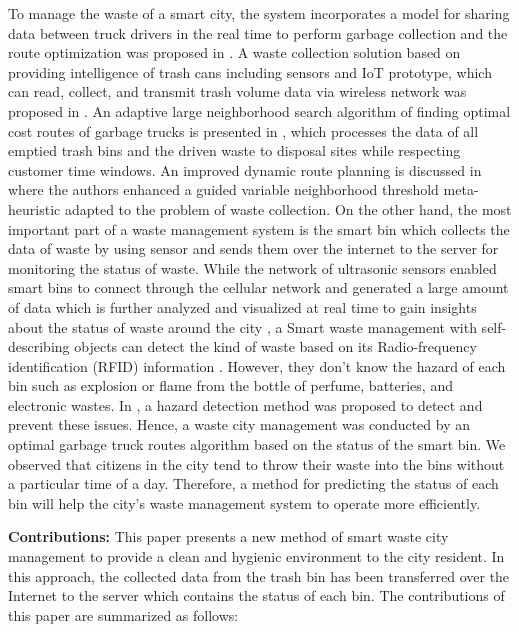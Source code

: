 \documentclass[conference,compsoc]{IEEEtran}
\begin{document}
\par To manage the waste of a smart city, the system incorporates a model for sharing data between truck drivers in the real time to perform garbage collection and the route optimization was proposed in \cite{Medvedev2015}. A waste collection solution based on providing intelligence of trash cans including sensors and IoT prototype, which can read, collect, and transmit trash volume data via wireless network was proposed in \cite{Gutierreza2015}\cite{Hong2014}. An adaptive large neighborhood search algorithm of finding optimal cost routes of garbage trucks is presented in \cite{Buhrkala212}, which processes the data of all emptied trash bins and the driven waste to disposal sites while respecting customer time windows. An improved dynamic route planning is discussed in \cite{Nuorito2006} where the authors enhanced a guided variable neighborhood threshold meta-heuristic adapted to the problem of waste collection. On the other hand, the most important part of a waste management system is the smart bin \cite{Sharma2015}\cite{Glouche2013}\cite{Sinhan2013} which collects the data of waste by using sensor and sends them over the internet to the server for monitoring the status of waste. While the network of ultrasonic sensors enabled smart bins to connect through the cellular network and generated a large amount of data which is further analyzed and visualized at real time to gain insights about the status of waste around the city \cite{Sharma2015}, a Smart waste management with self-describing objects can detect the kind of waste based on its Radio-frequency identification (RFID) information \cite{Glouche2013}. However, they don't know the hazard of each bin such as explosion or flame from the bottle of perfume, batteries, and electronic wastes. In \cite{Sinhan2013}, a hazard detection method was proposed to detect and prevent these issues. Hence, a waste city management was conducted by an optimal garbage truck routes algorithm based on the status of the smart bin. We observed that citizens in the city tend to throw their waste into the bins without a particular time of a day. Therefore, a method for predicting the status of each bin will help the city's waste management system to operate more efficiently. 

 
\par\textbf{Contributions:} 
This paper presents a new method of smart waste city management to provide a clean and hygienic environment to the city resident. In this approach, the collected data from the trash bin has been transferred over the Internet to the server which contains the status of each bin. The contributions of this paper are summarized as follows:
\end{document}
